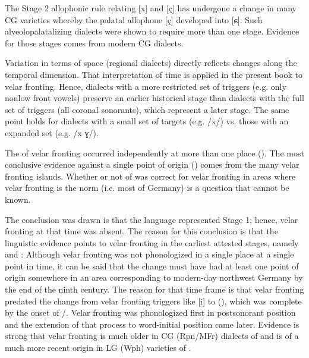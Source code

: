 The Stage 2 allophonic rule relating [x] and [ç] has undergone a change in many CG varieties whereby the palatal allophone [ç] developed into [ɕ]. Such alveolopalatalizing dialects were shown to require more than one stage. Evidence for those stages comes from modern CG dialects.

Variation in terms of space (regional dialects) directly reflects changes along the temporal dimension. That interpretation of time is applied in the present book to velar fronting. Hence, dialects with a more restricted set of triggers (e.g. only nonlow front vowels) preserve an earlier historical stage than dialects with the full set of triggers (all coronal sonorants), which represent a later stage. The same point holds for dialects with a small set of targets (e.g. /x/) vs. those with an expanded set (e.g. /x ɣ/).

The  of velar fronting occurred independently at more than one place (). The most conclusive evidence against a single point of origin () comes from the many velar fronting islands. Whether or not  of  was correct for velar fronting in areas where velar fronting is the norm (i.e. most of Germany) is a question that cannot be known.

The conclusion was drawn is that the  language represented Stage 1; hence, velar fronting at that time was absent. The reason for this conclusion is that the linguistic evidence points to velar fronting in the earliest attested stages, namely  and : Although velar fronting was not phonologized in a single place at a single point in time, it can be said that the change must have had at least one point of origin somewhere in an area corresponding to modern-day northwest Germany by the end of the ninth century. The reason for that time frame is that velar fronting predated the change from  velar fronting triggers like [i] to  (), which was complete by the onset of /. Velar fronting was phonologized first in postsonorant position and the extension of that process to word-initial position came later. Evidence is strong that velar fronting is much older in CG (Rpn/MFr) dialects of  and is of a much more recent origin in LG (Wph) varieties of .

